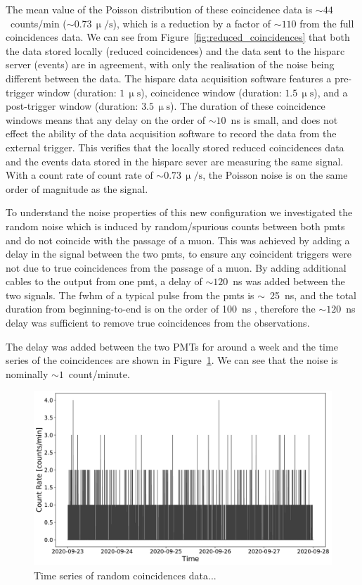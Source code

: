 The mean value of the Poisson distribution of these coincidence data is $\sim 44$~counts/min ($\sim 0.73 \, \upmu/\mathrm{s}$), which is a reduction by a factor of $\sim 110$ from the full coincidences data. We can see from Figure~\ref{fig:reduced_coincidences} that both the data stored locally (reduced coincidences) and the data sent to the \gls{hisparc} server (events) are in agreement, with only the realisation of the noise being different between the data. The \gls{hisparc} data acquisition software features a pre-trigger window (duration: $1 \, \upmu\mathrm{s}$), coincidence window (duration: $1.5 \, \upmu\mathrm{s}$), and a post-trigger window (duration: $3.5 \, \upmu\mathrm{s}$). The duration of these coincidence windows means that any delay on the order of $\sim 10$~ns is small, and does not effect the ability of the data acquisition software to record the data from the external trigger. This verifies that the locally stored reduced coincidences data and the events data stored in the \gls{hisparc} sever are measuring the same signal. With a count rate of count rate of $\sim 0.73 \, \upmu/\mathrm{s}$, the Poisson noise is on the same order of magnitude as the signal.


To understand the noise properties of this new configuration we investigated the random noise which is induced by random/spurious counts between both \glspl{pmt} and do not coincide with the passage of a muon. This was achieved by adding a delay in the signal between the two \glspl{pmt}, to ensure any coincident triggers were not due to true coincidences from the passage of a muon. By adding additional cables to the output from one \gls{pmt}, a delay of $\sim 120$~ns was added between the two signals. The \gls{fwhm} of a typical pulse from the \glspl{pmt} is $\sim$~25~ns, and the total duration from beginning-to-end is on the order of 100~ns \citep{van_dam_hisparc_2020}, therefore the $\sim 120$~ns delay was sufficient to remove true coincidences from the observations.

The delay was added between the two PMTs for around a week and the time series of the coincidences are shown in Figure~\ref{fig:random_coinciences}. We can see that the noise is nominally $\sim 1$~count/minute.

\begin{figure}[ht!]
	\centering
	\includegraphics[width=\columnwidth]{random_noise_timeseries.pdf}
	\caption{Time series of random coincidences data...}
	\label{fig:random_coinciences}
\end{figure}

